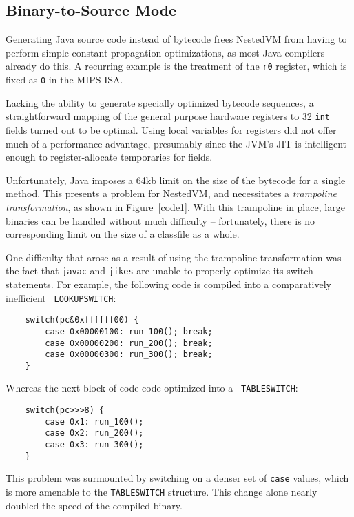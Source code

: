 \documentclass{acmconf}
\begin{document}
\subsection{Binary-to-Source Mode}

Generating Java source code instead of bytecode frees NestedVM from
having to perform simple constant propagation optimizations, as most
Java compilers already do this.  A recurring example is the treatment
of the {\tt r0} register, which is fixed as {\tt 0} in the MIPS ISA.

Lacking the ability to generate specially optimized bytecode
sequences, a straightforward mapping of the general purpose hardware
registers to 32 {\tt int} fields turned out to be optimal.  Using
local variables for registers did not offer much of a performance
advantage, presumably since the JVM's JIT is intelligent enough to
register-allocate temporaries for fields.


Unfortunately, Java imposes a 64kb limit on the size of the bytecode
for a single method.  This presents a problem for NestedVM, and
necessitates a {\it trampoline transformation}, as shown in
Figure~\ref{code1}.  With this trampoline in place, large binaries can
be handled without much difficulty -- fortunately, there is no
corresponding limit on the size of a classfile as a whole.

One difficulty that arose as a result of using the trampoline
transformation was the fact that {\tt javac} and {\tt jikes} are
unable to properly optimize its switch statements.  For example, the
following code is compiled into a comparatively inefficient {\tt
LOOKUPSWITCH}:

{\footnotesize
\begin{verbatim}
    switch(pc&0xffffff00) {
        case 0x00000100: run_100(); break;
        case 0x00000200: run_200(); break;
        case 0x00000300: run_300(); break;
    }
\end{verbatim}}

Whereas the next block of code code optimized into a {\tt
TABLESWITCH}:

{\footnotesize
\begin{verbatim}
    switch(pc>>>8) {
        case 0x1: run_100();
        case 0x2: run_200();
        case 0x3: run_300();
    }
\end{verbatim}}

This problem was surmounted by switching on a denser set of {\tt case}
values, which is more amenable to the {\tt TABLESWITCH} structure.
This change alone nearly doubled the speed of the compiled binary.
\end{document}

